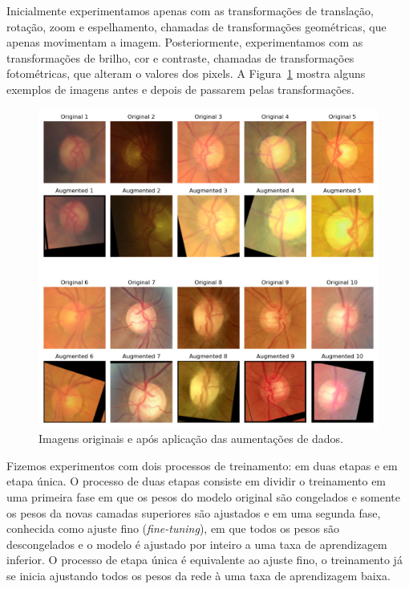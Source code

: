 \documentclass[12pt]{article}
\begin{document}
Inicialmente experimentamos apenas com as transformações de translação, rotação, zoom e espelhamento, chamadas de transformações geométricas, que apenas movimentam a imagem. Posteriormente, experimentamos com as transformações de brilho, cor e contraste, chamadas de transformações fotométricas, que alteram o valores dos pixels. A Figura~\ref{fig:augmentations} mostra alguns exemplos de imagens antes e depois de passarem pelas transformações.

\begin{figure}[htb]
 \centering
 \includegraphics[width=1.0\textwidth]{images/augmentations.jpg}
 \caption{Imagens originais e após aplicação das aumentações de dados.}
 \label{fig:augmentations}
\end{figure}

Fizemos experimentos com dois processos de treinamento: em duas etapas e em etapa única. O processo de duas etapas consiste em dividir o treinamento em uma primeira fase em que os pesos do modelo original são congelados e somente os pesos da novas camadas superiores são ajustados e em uma segunda fase, conhecida como ajuste fino (\emph{fine-tuning}), em que todos os pesos são descongelados e o modelo é ajustado por inteiro a uma taxa de aprendizagem inferior. O processo de etapa única é equivalente ao ajuste fino, o treinamento já se inicia ajustando todos os pesos da rede à uma taxa de aprendizagem baixa.
\end{document}
